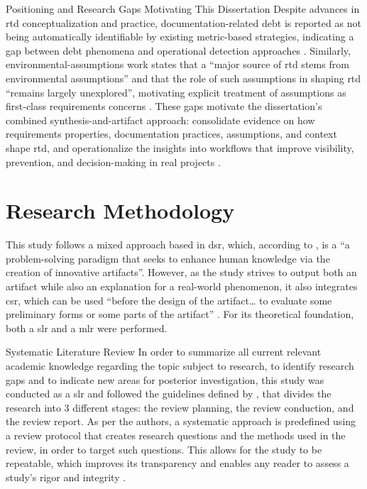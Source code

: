\documentclass[12pt,reqno, twoside]{amsbook}
\makeatletter
\def\section{\@startsection{section}{1}%
      \z@{.5\linespacing\@plus.7\linespacing}{.25\linespacing}%
      {\normalfont\bfseries\flushleft}}
\theoremstyle{plain}
\numberwithin{equation}{chapter}
\numberwithin{section}{chapter}
\makeatother
\begin{document}
\section{Positioning and Research Gaps Motivating This Dissertation}
\noindent Despite advances in \gls{rtd} conceptualization and practice, documentation-related debt is reported as not being automatically identifiable by existing metric-based strategies, indicating a gap between debt phenomena and operational detection approaches \parencite{Rios2020}. Similarly, environmental-assumptions work states that a ``major source of \gls{rtd} stems from environmental assumptions'' and that the role of such assumptions in shaping \gls{rtd} ``remains largely unexplored'', motivating explicit treatment of assumptions as first-class requirements concerns \parencite{Alenazi2025c}. These gaps motivate the dissertation's combined synthesis-and-artifact approach: consolidate evidence on how requirements properties, documentation practices, assumptions, and context shape \gls{rtd}, and operationalize the insights into workflows that improve visibility, prevention, and decision-making in real projects \parencite{Arvanitou2019,Freire2020,Melo2022}.

\chapter{Research Methodology}
This study follows a mixed approach based in \gls{dsr}, which, according to \textcite{Brocke2020}, is a
 “a problem-solving paradigm that seeks to enhance human knowledge via the creation of innovative
  artifacts”. However, as the study strives to output both an artifact while also an explanation for a real-world phenomenon,
  it also integrates \gls{csr}, which can be used “before the 
  design of the artifact… to evaluate some preliminary forms or some parts of 
  the artifact” \parencite{Costa2016}. For its theoretical foundation, both a \gls{slr} and a \gls{mlr} were performed.

\section{Systematic Literature Review}
\noindent In order to summarize all current relevant academic knowledge regarding the topic subject to research, to identify research gaps and to indicate new areas for posterior investigation, this study was conducted as a \gls{slr} and followed the guidelines defined by \textcite{Kitchenham2007}, that divides the research into 3 different stages: the review planning, the review conduction, and the review report. As per the authors, a systematic approach is predefined using a review protocol that creates research questions and the methods used in the review, in order to target such questions. This allows for the study to be repeatable, which improves its transparency and enables any reader to assess a study's rigor and integrity \parencite{Kitchenham2007}.
\end{document}
